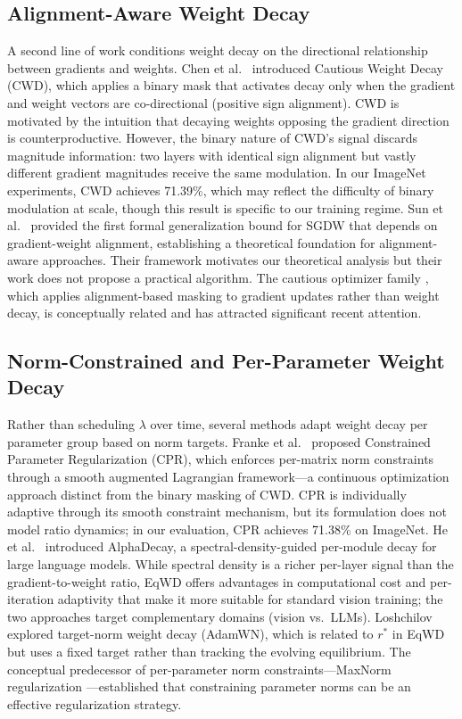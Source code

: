 \documentclass{article}
\begin{document}
\subsection{Alignment-Aware Weight Decay}
\label{sec:related_alignment}

A second line of work conditions weight decay on the directional
relationship between gradients and weights. Chen et
al.~\citep{chen2026cwd} introduced Cautious Weight Decay (CWD), which
applies a binary mask that activates decay only when the gradient and
weight vectors are co-directional (positive sign alignment). CWD is
motivated by the intuition that decaying weights opposing the gradient
direction is counterproductive. However, the binary nature of CWD's
signal discards magnitude information: two layers with identical sign
alignment but vastly different gradient magnitudes receive the same
modulation. In our ImageNet experiments, CWD achieves 71.39\%, which may
reflect the difficulty of binary modulation at scale, though this result
is specific to our training regime. Sun et
al.~\citep{sun2025cvpr} provided the first formal generalization bound
for SGDW that depends on gradient-weight alignment, establishing a
theoretical foundation for alignment-aware approaches. Their framework
motivates our theoretical analysis but their work does not propose a
practical algorithm. The cautious optimizer family
\citep{luo2024cautious}, which applies alignment-based masking to
gradient updates rather than weight decay, is conceptually related and
has attracted significant recent attention.

\subsection{Norm-Constrained and Per-Parameter Weight Decay}
\label{sec:related_norm}

Rather than scheduling $\lambda$ over time, several methods adapt
weight decay per parameter group based on norm targets. Franke et
al.~\citep{franke2024cpr} proposed Constrained Parameter Regularization
(CPR), which enforces per-matrix norm constraints through a smooth
augmented Lagrangian framework---a continuous optimization approach
distinct from the binary masking of CWD. CPR is individually adaptive
through its smooth constraint mechanism, but its formulation does not
model ratio dynamics; in our evaluation, CPR achieves 71.38\% on
ImageNet. He et al.~\citep{he2025alphadecay} introduced AlphaDecay, a
spectral-density-guided per-module decay for large language models.
While spectral density is a richer per-layer signal than the
gradient-to-weight ratio, EqWD offers advantages in computational cost
and per-iteration adaptivity that make it more suitable for standard
vision training; the two approaches target complementary domains (vision
vs.~LLMs). Loshchilov \citep{loshchilov2023weightnorm} explored
target-norm weight decay (AdamWN), which is related to $r^*$ in EqWD
but uses a fixed target rather than tracking the evolving equilibrium.
The conceptual predecessor of per-parameter norm constraints---MaxNorm
regularization
\citep{hinton2012improving, srivastava2014dropout}---established that
constraining parameter norms can be an effective regularization
strategy.
\end{document}
